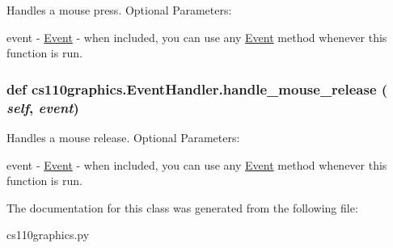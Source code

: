 Handles a mouse press. Optional Parameters:
\begin{DoxyItemize}
\item event -\/ \hyperlink{classcs110graphics_1_1Event}{Event} -\/ when included, you can use any \hyperlink{classcs110graphics_1_1Event}{Event} method whenever this function is run. 
\end{DoxyItemize}\hypertarget{classcs110graphics_1_1EventHandler_a320a7dbf68d37e0101b237bff1713088}{
\subsubsection[{handle\_\-mouse\_\-release}]{\setlength{\rightskip}{0pt plus 5cm}def cs110graphics.EventHandler.handle\_\-mouse\_\-release ( {\em self}, \/   {\em event})}}
\label{classcs110graphics_1_1EventHandler_a320a7dbf68d37e0101b237bff1713088}


Handles a mouse release. Optional Parameters:
\begin{DoxyItemize}
\item event -\/ \hyperlink{classcs110graphics_1_1Event}{Event} -\/ when included, you can use any \hyperlink{classcs110graphics_1_1Event}{Event} method whenever this function is run. 
\end{DoxyItemize}

The documentation for this class was generated from the following file:\begin{DoxyCompactItemize}
\item 
cs110graphics.py\end{DoxyCompactItemize}
